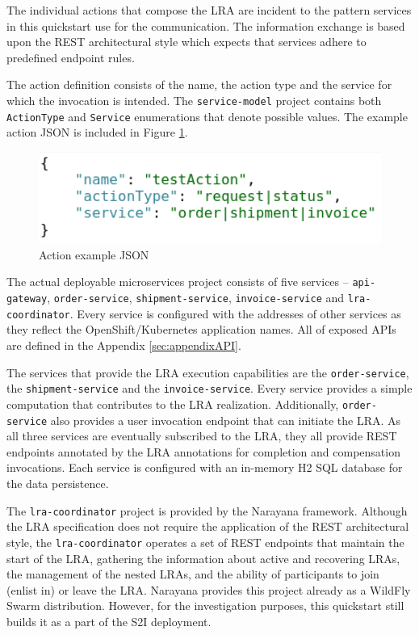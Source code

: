 \documentclass[oneside,
  digital, %
  table,   %
  lof,     %
  lot,     %
]{fithesis3}
\begin{document}
The individual actions that compose the LRA are incident to the pattern services in this quickstart use for the communication. The information exchange is based upon the REST architectural style which expects that services adhere to predefined endpoint rules. 

The action definition consists of the name, the action type and the service for which the invocation is intended. The \texttt{service-model} project contains both \texttt{ActionType} and \texttt{Service} enumerations that denote possible values. The example action JSON is included in Figure \ref{fig:action-json}.

\begin{figure}[h]
    \begin{center}
        \includegraphics[height=30mm]{images/actionJSON.png}
    \end{center}
    \caption{Action example JSON}
    \label{fig:action-json}
\end{figure}

The actual deployable microservices project consists of five services -- \texttt{api-gateway}, \texttt{order-service}, \texttt{shipment-service}, \texttt{invoice-service} and \texttt{lra-coordinator}. Every service is configured with the addresses of other services as they reflect the OpenShift/Kubernetes application names. All of exposed APIs are defined in the Appendix \ref{sec:appendixAPI}.

The services that provide the LRA execution capabilities are the \texttt{order-service}, the \texttt{shipment-service} and the \texttt{invoice-service}. Every service provides a simple computation that contributes to the LRA realization. Additionally, \texttt{order-service} also provides a user invocation endpoint that can initiate the LRA. As all three services are eventually subscribed to the LRA, they all provide REST endpoints annotated by the LRA annotations for completion and compensation invocations. Each service is configured with an in-memory H2 SQL database for the data persistence.

The \texttt{lra-coordinator} project is provided by the Narayana framework. Although the LRA specification does not require the application of the REST architectural style, the \texttt{lra-coordinator} operates a set of REST endpoints that maintain the start of the LRA, gathering the information about active and recovering LRAs, the management of the nested LRAs, and the ability of participants to join (enlist in) or leave the LRA. Narayana provides this project already as a WildFly Swarm distribution. However, for the investigation purposes, this quickstart still builds it as a part of the S2I deployment.
\end{document}
